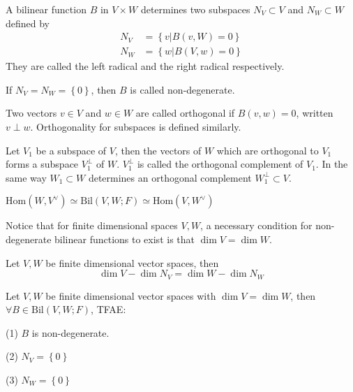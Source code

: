 \begin{definition}[radicals]
A bilinear function $B$ in $V\times W$ determines two subspaces $N_V\subset V$ and $N_W\subset W$ defined by 
\begin{align*}
N_V&=\left \{ v|B(v,W)=0 \right \} \\
N_W&=\left \{ w|B(V,w)=0 \right \} 
\end{align*}
They are called the left radical and the right radical respectively.
\end{definition}
\begin{definition}
If $N_V=N_W=\left \{ 0 \right \} $, then $B$ is called non-degenerate.
\end{definition}
\begin{definition}[orthogonality]
Two vectors $v\in V$ and $w\in W$ are called orthogonal if $B(v,w)=0$, written $v\perp w$. Orthogonality for subspaces is defined similarly.
\end{definition}
\begin{definition}
Let $V_1$ be a subspace of $V$, then the vectors of $W$ which are orthogonal to $V_1$ forms a subspace $V_1^\perp$ of $W$. $V_1^\perp$ is called the orthogonal complement of $V_1$. In the same way $W_1\subset W$ determines an orthogonal complement $W_1^\perp\subset V$.
\end{definition}

\begin{theorem}
$\text{Hom}(W,V^\vee)\simeq \text{Bil}(V,W;F)\simeq \text{Hom}(V,W^\vee)$
\end{theorem}
\begin{remark}
Notice that for finite dimensional spaces $V,W$, a necessary condition for non-degenerate bilinear functions to exist is that $\dim V=\dim W$.
\end{remark}
\begin{corollary}
Let $V,W$ be finite dimensional vector spaces, then \[\dim V-\dim N_V=\dim W-\dim N_W\]
\end{corollary}
\begin{theorem}
Let $V,W$ be finite dimensional vector spaces with $\dim V=\dim W$, then $\forall B\in \text{Bil}(V,W;F)$, TFAE:\par
(1) $B$ is non-degenerate.\par
(2) $N_V=\left\{0\right\}$\par
(3) $N_W=\left\{0\right\}$
\end{theorem}



